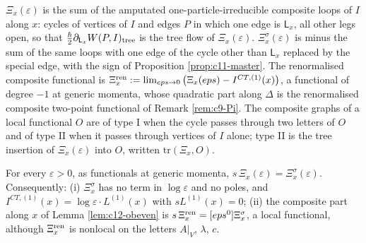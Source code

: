 \begin{definition}
\label{def:c12-Xi}
$\Xi_x(\varepsilon)$ is the sum of the amputated one-particle-irreducible composite loops of $I$ along $x$: cycles of vertices of $I$ and edges $P$ in which one edge is $\mathsf L_x$, all other legs open, so that $\tfrac\hbar2\partial_{\mathsf L_x}W(P,I)_{\rm tree}$ is the tree flow of $\Xi_x(\varepsilon)$. $\Xi^\sigma_x(\varepsilon)$ is minus the sum of the same loops with one edge of the cycle other than $\mathsf L_x$ replaced by the special edge, with the sign of Proposition \ref{prop:c11-master}. The renormalised composite functional is $\Xi^{\rm ren}_x:=\lim_{\varepsilon\to0}\big(\Xi_x(\varepsilon)-I^{CT,(1)}(x)\big)$, a functional of degree $-1$ at generic momenta, whose quadratic part along $\Delta$ is the renormalised composite two-point functional of Remark \ref{rem:c9-Pi}. The composite graphs of a local functional $O$ are of type I when the cycle passes through two letters of $O$ and of type II when it passes through vertices of $I$ alone; type II is the tree insertion of $\Xi_x(\varepsilon)$ into $O$, written $\mathrm{tr}(\Xi_x,O)$.
\end{definition}

\begin{lemma}
\label{lem:c12-Cid}
For every $\varepsilon>0$, as functionals at generic momenta, $s\,\Xi_x(\varepsilon)=\Xi^\sigma_x(\varepsilon)$. Consequently: (i) $\Xi^\sigma_x$ has no term in $\log\varepsilon$ and no poles, and $I^{CT,(1)}(x)=\log\varepsilon\cdot L^{(1)}(x)$ with $sL^{(1)}(x)=0$; (ii) the composite part along $x$ of Lemma \ref{lem:c12-obeven} is $s\,\Xi^{\rm ren}_x=[\varepsilon^0]\Xi^\sigma_x$, a local functional, although $\Xi^{\rm ren}_x$ is nonlocal on the letters $A|_V$, $\lambda$, $c$.
\end{lemma}


